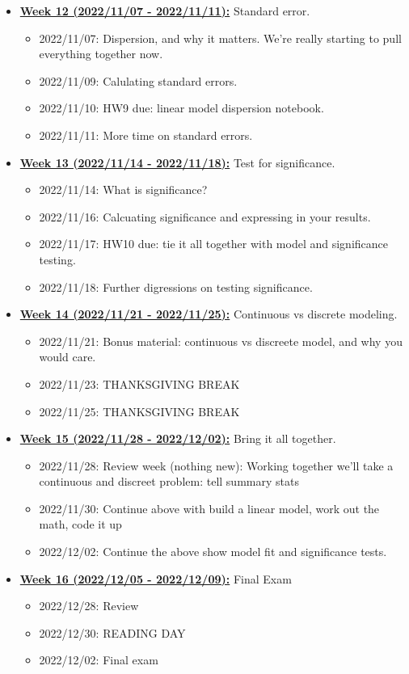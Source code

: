 \documentclass[11pt]{article}
\begin{document}
\begin{itemize}
  \item \underline{\textbf{Week 12 (2022/11/07 - 2022/11/11):}} Standard error. 
  \begin{itemize}
    \item 2022/11/07: Dispersion, and why it matters. We're really starting to pull everything together now.
    \item 2022/11/09: Calulating standard errors. 
    \item 2022/11/10: HW9 due: linear model dispersion notebook. 
    \item 2022/11/11: More time on standard errors.
  \end{itemize}


  \item \underline{\textbf{Week 13 (2022/11/14 - 2022/11/18):}} Test for significance. 
  \begin{itemize}
    \item 2022/11/14: What is significance?
    \item 2022/11/16: Calcuating significance and expressing in your results. 
    \item 2022/11/17: HW10 due: tie it all together with model and significance testing. 
    \item 2022/11/18: Further digressions on testing significance. 
  \end{itemize}


  \item \underline{\textbf{Week 14 (2022/11/21 - 2022/11/25):}} Continuous vs discrete modeling. 
  \begin{itemize}
    \item 2022/11/21: Bonus material: continuous vs discreete model, and why you would care. 
    \item 2022/11/23: THANKSGIVING BREAK
    \item 2022/11/25: THANKSGIVING BREAK
  \end{itemize}


  \item \underline{\textbf{Week 15 (2022/11/28 - 2022/12/02):}} Bring it all together. 
  \begin{itemize}
    \item 2022/11/28: Review week (nothing new): Working together we'll take a continuous and discreet problem: tell summary stats
    \item 2022/11/30: Continue above with build a linear model, work out the math, code it up
    \item 2022/12/02: Continue the above show model fit and significance tests. 
  \end{itemize}

  \item \underline{\textbf{Week 16 (2022/12/05 - 2022/12/09):}} Final Exam
  \begin{itemize}
    \item 2022/12/28: Review
    \item 2022/12/30: READING DAY
    \item 2022/12/02: Final exam
  \end{itemize}
\end{itemize}
\end{document}
